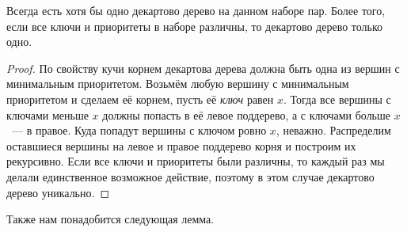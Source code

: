 
\begin{lemma} Всегда есть хотя бы одно декартово дерево на данном наборе пар.
	Более того, если все ключи и приоритеты в наборе различны, то
	декартово дерево только одно.
\end{lemma}
\begin{proof} По свойству кучи корнем декартова дерева должна быть одна из вершин с минимальным приоритетом. Возьмём любую вершину с минимальным приоритетом и сделаем её корнем, пусть её \emph{ключ} равен $x$. Тогда все вершины с ключами меньше $x$ должны попасть в её левое поддерево, а с ключами больше $x$~--- в правое. Куда попадут вершины с ключом ровно $x$, неважно. Распределим оставшиеся вершины на левое и правое поддерево корня и построим их рекурсивно. Если все ключи и приоритеты были различны, то каждый раз мы делали единственное возможное действие, поэтому в этом случае декартово дерево уникально.
\end{proof}

Также нам понадобится следующая лемма.

